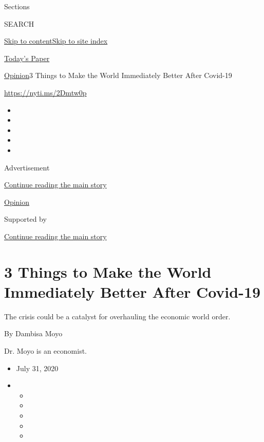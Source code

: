 Sections

SEARCH

\protect\hyperlink{site-content}{Skip to
content}\protect\hyperlink{site-index}{Skip to site index}

\href{https://myaccount.nytimes3xbfgragh.onion/auth/login?response_type=cookie\&client_id=vi}{}

\href{https://www.nytimes3xbfgragh.onion/section/todayspaper}{Today's
Paper}

\href{/section/opinion}{Opinion}\textbar{}3 Things to Make the World
Immediately Better After Covid-19

\url{https://nyti.ms/2Dmtw0p}

\begin{itemize}
\item
\item
\item
\item
\item
\end{itemize}

Advertisement

\protect\hyperlink{after-top}{Continue reading the main story}

\href{/section/opinion}{Opinion}

Supported by

\protect\hyperlink{after-sponsor}{Continue reading the main story}

\hypertarget{3-things-to-make-the-world-immediately-better-after-covid-19}{%
\section{3 Things to Make the World Immediately Better After
Covid-19}\label{3-things-to-make-the-world-immediately-better-after-covid-19}}

The crisis could be a catalyst for overhauling the economic world order.

By Dambisa Moyo

Dr. Moyo is an economist.

\begin{itemize}
\item
  July 31, 2020
\item
  \begin{itemize}
  \item
  \item
  \item
  \item
  \item
  \end{itemize}
\end{itemize}

